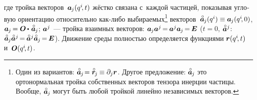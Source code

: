 \begin{otherlanguage}{russian}
\vspace{-0.1em} \noindent где тройка векторов~${\bm{a}_{\hspace{-0.12ex}j}(q^i\hspace{-0.4ex}, t)}$ жёстко связана с~каждой частицей, показывая угловую ориентацию относительно как\hbox{-}либо выбираемых\footnote{Один из вариантов: ${\mathcircabove{\bm{a}}_{\hspace{-0.12ex}j} \hspace{-0.4ex} = \initialvector_{\hspace{-0.2ex}j} \hspace{-0.1ex} \equiv \partial_j \currentvector}$.
Другое предложение: ${\mathcircabove{\bm{a}}_{\hspace{-0.12ex}j} \hspace{-0.2ex}}$ это ортонормальная тройка собственных векторов тензора инерции частицы. %
Вообще, ${\mathcircabove{\bm{a}}_{\hspace{-0.12ex}j} \hspace{-0.2ex}}$ могут быть любой тройкой линейно независимых векторов.}\hspace{-0.25ex}
векторов~${\mathcircabove{\bm{a}}_{\hspace{-0.12ex}j}(q^i) \equiv \bm{a}_{\hspace{-0.12ex}j}(q^i\hspace{-0.4ex}, 0)}$,
${\bm{a}_{\hspace{-0.12ex}j} \hspace{-0.2ex} = \rotationtensor \hspace{-0.1ex} \dotp \hspace{.2ex} \mathcircabove{\bm{a}}_{\hspace{-0.12ex}j}}$;
${\bm{a}^j\hspace{-0.2ex}}$~--- тройка взаимных векторов:
${\bm{a}_{\hspace{-0.12ex}j} \bm{a}^j \hspace{-0.25ex} = \hspace{-0.15ex} \bm{a}^j \bm{a}_{\hspace{-0.12ex}j} \hspace{-0.25ex} = \hspace{-0.2ex} \bm{E}}$
(${t\!=\!0}$, ${\mathcircabove{\bm{a}}^j}$: ${\mathcircabove{\bm{a}}_{\hspace{-0.12ex}j} \mathcircabove{\bm{a}}^j \hspace{-0.25ex} = \hspace{-0.15ex} \mathcircabove{\bm{a}}^j \mathcircabove{\bm{a}}_{\hspace{-0.12ex}j} \hspace{-0.25ex} = \hspace{-0.2ex} \bm{E}}$).
Движение среды полностью определяется функциями ${\bm{r}(q^i\hspace{-0.4ex}, t)}$ и~${\bm{O}(q^i\hspace{-0.4ex}, t)}$.


\end{otherlanguage}
